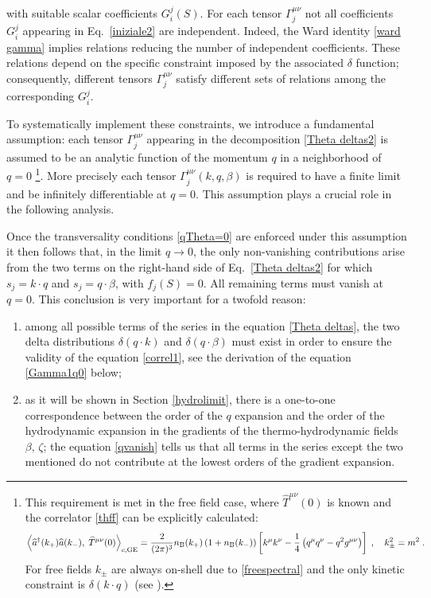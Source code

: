 \documentclass[prd,superscriptaddress,nofootinbib,notitlepage]{revtex4-1}
\def\wT{{\widehat T}}
\begin{document}
%
with suitable scalar coefficients $G^{j}_i(S)$. 
For each tensor $\Gamma^{\mu\nu}_j$ not all coefficients $G^j_i$ appearing in Eq.~\eqref{iniziale2} are independent. 
Indeed, the Ward identity \eqref{ward gamma} implies relations reducing the number of independent coefficients. 
These relations depend on the specific constraint imposed by the associated $\delta$ function; consequently, different
tensors $\Gamma^{\mu\nu}_j$ satisfy different sets of relations among the corresponding $G^j_i$.

To systematically implement these constraints, we introduce a fundamental assumption: each tensor $\Gamma^{\mu\nu}_j$ 
appearing in the decomposition \eqref{Theta deltas2} is assumed to be an analytic function of the momentum $q$ in a 
neighborhood of $q=0$ \footnote{This requirement is met in the free field case, where $\wT^{\mu\nu}(0)$ is known and the
correlator \eqref{thff} can be explicitly calculated:
%
$$
 \left\langle\widehat{a}^\dagger(k_+)\widehat{a}(k_-),\;\wT^{\mu\nu}(0)\right\rangle_{c,\rm GE}=\frac{2}{(2\pi)^3}n_{\rm B}(k_+)\left(1+n_{\rm B}(k_-)\right)\left[k^\mu k^\nu-\frac{1}{4}\left(q^\mu q^\nu-q^2g^{\mu\nu}\right)\right]\;,\quad k^2_\pm=m^2\;.
$$
For free fields $k_\pm$ are always on-shell due to \eqref{freespectral} and the only kinetic constraint is $\delta\left(k\cdot q\right)$ (see \cite{Sheng:2025cjk}).
%
}. More precisely each tensor $\Gamma^{\mu\nu}_j(k,q,\beta)$ is required to have a finite limit and
be infinitely differentiable at $q=0$. This assumption plays a crucial role in the following analysis.

Once the transversality conditions \eqref{qTheta=0} are enforced under this assumption it then follows that, in the limit 
$q \to 0$, the only non-vanishing contributions arise from the two terms on the right-hand side of Eq.~\eqref{Theta deltas2} 
for which $s_j = k \cdot q$ and $s_j = q \cdot \beta$, with $f_j(S)=0$. All remaining terms must vanish at $q=0$. 
This conclusion is very important for a twofold reason:
%
\begin{enumerate}
    \item {} among all possible terms of the series in the equation \eqref{Theta deltas}, the two delta distributions
    $\delta(q\cdot k)$ and $\delta(q\cdot \beta)$ must exist in order to ensure the validity of the equation \eqref{correl1}, see the derivation of the equation \eqref{Gamma1q0} below;
    \item {} as it will be shown in Section \ref{hydrolimit}, there is a one-to-one correspondence between the order of 
    the $q$ expansion and the order of the hydrodynamic expansion in the gradients of the thermo-hydrodynamic fields $\beta,\, \zeta$; the equation \eqref{qvanish} tells us that all terms in the series except the two mentioned do not
    contribute at the lowest orders of the gradient expansion.
\end{enumerate}
%
\end{document}
